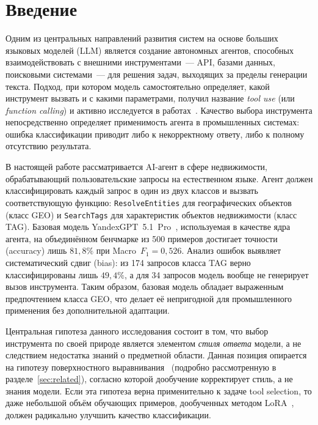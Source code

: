 
\section{Введение}

Одним из центральных направлений развития систем на основе больших языковых моделей (LLM) является создание автономных агентов, способных взаимодействовать с внешними инструментами~--- API, базами данных, поисковыми системами~--- для решения задач, выходящих за пределы генерации текста. Подход, при котором модель самостоятельно определяет, какой инструмент вызвать и с какими параметрами, получил название \textit{tool use} (или \textit{function calling}) и активно исследуется в работах~\cite{schick2023toolformer, patil2023gorilla, qin2024toollearning}. Качество выбора инструмента непосредственно определяет применимость агента в промышленных системах: ошибка классификации приводит либо к некорректному ответу, либо к полному отсутствию результата.

В настоящей работе рассматривается AI-агент в сфере недвижимости, обрабатывающий пользовательские запросы на естественном языке. Агент должен классифицировать каждый запрос в один из двух классов и вызвать соответствующую функцию: \texttt{ResolveEntities} для географических объектов (класс GEO) и \texttt{SearchTags} для характеристик объектов недвижимости (класс TAG). Базовая модель YandexGPT~5.1~Pro~\cite{yandexgpt2024docs}, используемая в качестве ядра агента, на объединённом бенчмарке из 500 примеров достигает точности (accuracy) лишь $81{,}8\%$ при Macro~$F_1 = 0{,}526$. Анализ ошибок выявляет систематический сдвиг (bias): из 174 запросов класса TAG верно классифицированы лишь $49{,}4\%$, а для 34 запросов модель вообще не генерирует вызов инструмента. Таким образом, базовая модель обладает выраженным предпочтением класса GEO, что делает её непригодной для промышленного применения без дополнительной адаптации.

Центральная гипотеза данного исследования состоит в том, что выбор инструмента по своей природе является элементом \textit{стиля ответа} модели, а не следствием недостатка знаний о предметной области. Данная позиция опирается на гипотезу поверхностного выравнивания~\cite{zhou2023lima, gudibande2023false} (подробно рассмотренную в разделе~\ref{sec:related}), согласно которой дообучение корректирует стиль, а не знания модели. Если эта гипотеза верна применительно к задаче tool selection, то даже небольшой объём обучающих примеров, дообученных методом LoRA~\cite{hu2022lora}, должен радикально улучшить качество классификации.

